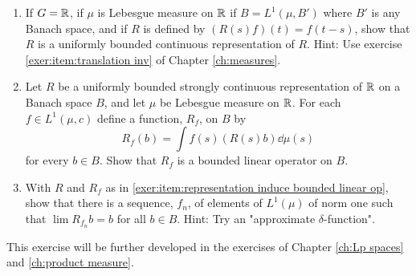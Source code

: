 \begin{enumerate}[label=\arabic*),ref=\arabic*]
\begin{enumerate}[label=\alph*),ref=\theenumi\alph*)]
    \item If $G=\mathbb{R}$, if $\mu$ is Lebesgue measure on $\mathbb{R}$ if $B=L^1(\mu,B')$ where $B'$ is any Banach space, and if $R$ is defined by $(R(s)f)(t)=f(t-s)$, show that $R$ is a uniformly bounded continuous representation of $R$. Hint: Use exercise \ref{exer:item:translation inv} of Chapter \ref{ch:measures}.
    
    \item \label{exer:item:representation induce bounded linear op}
    Let $R$ be a uniformly bounded strongly continuous representation of $\mathbb{R}$ on a Banach space $B$, and let $\mu$ be Lebesgue measure on $\mathbb{R}$. For each $f\in L^1(\mu,c)$ define a function, $R_f$, on $B$ by $$R_f(b)=\int f(s)(R(s)b)\dd\mu(s)$$ for every $b \in B$. Show that $R_f$ is a bounded linear operator on $B$.

    \item With $R$ and $R_f$ as in \ref{exer:item:representation induce bounded linear op}, show that there is a sequence, $f_n$, of elements of $L^1(\mu)$ of norm one such that $\lim R_{f_n} b=b$ for all $b\in B$. Hint: Try an "approximate $\delta$-function".
\end{enumerate}
This exercise will be further developed in the exercises of Chapter \ref{ch:Lp spaces} and \ref{ch:product measure}.
\end{enumerate}